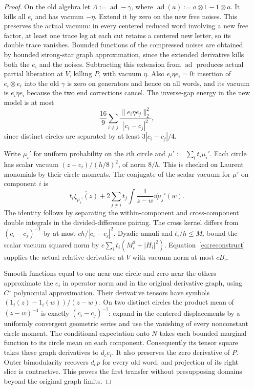 \begin{proof}
On the old algebra let $\Lambda:=\operatorname{ad}-\gamma$, where $\operatorname{ad}(a):=a\otimes1-1\otimes a$.
It kills all $e_i$ and has vacuum $-\eta$.
Extend it by zero on the new free noises.
This preserves the actual vacuum: in every centered reduced word involving a new free factor, at least one trace leg at each cut retains a centered new letter, so its double trace vanishes.
Bounded functions of the compressed noises are obtained by bounded strong-star graph approximation, since the extended derivative kills both the $e_i$ and the noises.
Subtracting this extension from $\operatorname{ad}$ produces actual partial liberation at $V$, killing $P$, with vacuum $\eta$.
Also $e_i\eta e_i=0$: insertion of $e_i\otimes e_i$ into the old $\gamma$ is zero on generators and hence on all words, and its vacuum is $e_i\eta e_i$ because the two end corrections cancel.
The inverse-gap energy in the new model is at most
\[
 \frac{16}{9}\sum_{i\ne j}\frac{\|e_i\eta e_j\|_2^2}{|c_i-c_j|^2},
\]
since distinct circles are separated by at least $3|c_i-c_j|/4$.

Write $\mu_i'$ for uniform probability on the $i$th circle and $\mu':=\sum_it_i\mu_i'$.
Each circle has scalar vacuum $(z-c_i)/(h/8)^2$, of norm $8/h$.
This is checked on Laurent monomials by their circle moments.
The conjugate of the scalar vacuum for $\mu'$ on component $i$ is
\[
 t_i\overline{\xi_{\mu_i'}(z)}+2\sum_{j\ne i}t_j\int\frac1{z-w}\dd\mu_j'(w).
\]
The identity follows by separating the within-component and cross-component double integrals in the divided-difference pairing.
The cross kernel differs from $(c_i-c_j)^{-1}$ by at most $ch/|c_i-c_j|^2$.
Dyadic annuli and $t_i/h\le M_i$ bound the scalar vacuum squared norm by $c\sum_it_i(M_i^2+|H_i|^2)$.
Equation~\eqref{eq:reconstruct} supplies the actual relative derivative at $V$ with vacuum norm at most $cB_c$.

Smooth functions equal to one near one circle and zero near the others approximate the $e_i$ in operator norm and in the original derivative graph, using $C^1$ polynomial approximation.
Their derivative tensors have symbols $(1_i(z)-1_i(w))/(z-w)$.
On two distinct circles the product mean of $(z-w)^{-1}$ is exactly $(c_i-c_j)^{-1}$: expand in the centered displacements by a uniformly convergent geometric series and use the vanishing of every nonconstant circle moment.
The conditional expectation onto $N$ takes each bounded marginal function to its circle mean on each component.
Consequently its tensor square takes these graph derivatives to $d_ce_i$.
It also preserves the zero derivative of $P$.
Outer bimodularity recovers $d_cp$ for every old word, and projection of its right slice is contractive.
This proves the first transfer without presupposing domains beyond the original graph limits.


\end{proof}
